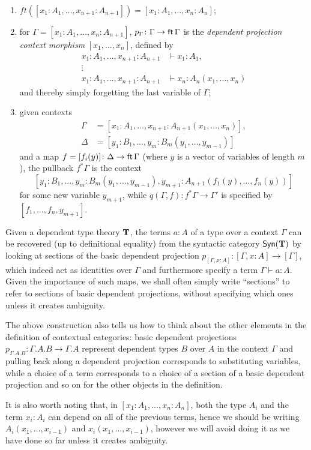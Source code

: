 \begin{construction}
\begin{enumerate}
    \item
      $ft([x_1:A_1,\ldots,x_{n+1}:A_{n+1}])=[x_1:A_1,\ldots,x_n:A_n]$;
    \item for $\Gamma=[x_1:A_1,\ldots,x_n:A_{n+1}]$,
      $p_{\Gamma}\colon\Gamma\rightarrow \operatorname{\mathsf{ft}}\Gamma$ is the \emph{dependent
      projection context morphism} $[x_1,\ldots,x_n]$, defined by
      \begin{align*}
        x_1:A_1,\ldots,x_{n+1}:A_{n+1} &\vdash x_1:A_1, \\
        \vdots & \\
        x_1:A_1,\ldots,x_{n+1}:A_{n+1} &\vdash x_n:A_n(x_1,\ldots,x_n)
      \end{align*}
      and thereby simply forgetting the last variable of $\Gamma$;
    \item given contexts
      \begin{align*}
        \Gamma &=[x_1:A_1,\ldots,x_{n+1}:A_{n+1}(x_1,\ldots,x_n)], \\
        \Delta &=[y_1:B_1,\ldots,y_m:B_m(y_1,\ldots,y_{m-1})]
      \end{align*}
      and a map $f=[f_i(y)]\colon\Delta\rightarrow\operatorname{\mathsf{ft}}\Gamma$ (where $y$ is a
      vector of variables of length $m$), the pullback $f^*\Gamma$ is the
      context
      \[[y_1:B_1,\ldots,y_m:B_m(y_1,\ldots,y_{m-1}),y_{m+1}:A_{n+1}(f_1(y),\ldots,f_n(y))]\]
      for some new variable $y_{m+1}$, while $q(\Gamma,f)\colon
      f^*\Gamma\rightarrow\Gamma'$ is specified by $[f_1,\ldots,f_n,y_{m+1}]$.
  \end{enumerate}
\end{construction}

\begin{rmk}
  Given a dependent type theory $\operatorname{\mathbf{T}}$, the terms $a:A$ of a type over a context
  $\Gamma$ can be recovered (up to definitional equality) from the syntactic
  category $\mathsf{Syn}(\operatorname{\mathbf{T}})$ by looking at sections of the basic dependent projection
  $p_{[\Gamma,x:A]}\colon[\Gamma,x:A]\rightarrow[\Gamma]$, which indeed act as
  identities over $\Gamma$ and furthermore specify a term $\Gamma\vdash a:A$.
  Given the importance of such maps, we shall often simply write ``sections'' to
  refer to sections of basic dependent projections, without specifying which ones
  unless it creates ambiguity.

  The above construction also tells us how to think about the other elements in
  the definition of contextual categories: basic dependent
  projections $p_{\Gamma.A.B}\colon\Gamma.A.B\rightarrow\Gamma.A$ represent
  dependent types $B$ over $A$ in the context $\Gamma$ and pulling back along
  a dependent projection corresponds to substituting variables, while a choice of
  a term corresponds to a choice of a section of a basic dependent projection
  and so on for the other objects in the definition.

  It is also worth noting that, in $[x_1:A_1,\ldots,x_n:A_n]$, both the type
  $A_i$ and the term $x_i:A_i$ can depend on all of the previous terms, hence we
  should be writing $A_i(x_1,\ldots,x_{i-1})$ and $x_i(x_1,\ldots,x_{i-1})$,
  however we will avoid doing it as we have done so far unless it creates
  ambiguity.
\end{rmk}

